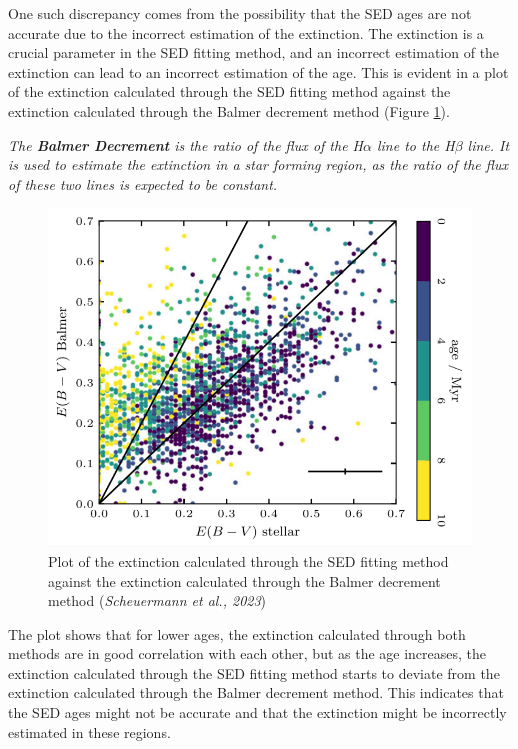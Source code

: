 \documentclass[12pt]{report}
\begin{document}
One such discrepancy comes from the possibility that the SED ages are not accurate due to the incorrect estimation of the extinction. The extinction is a crucial parameter in the SED fitting method, and an incorrect estimation of the extinction can lead to an incorrect estimation of the age. This is evident in a plot of the extinction calculated through the SED fitting method against the extinction calculated through the Balmer decrement method (Figure \ref{fig:image21}). 

\vspace*{0.6cm}
\textit{The \textbf{Balmer Decrement} is the ratio of the flux of the H$\alpha$ line to the H$\beta$ line. It is used to estimate the extinction in a star forming region, as the ratio of the flux of these two lines is expected to be constant.}\\

\begin{figure}[htbp]
    \centering
    \includegraphics[scale = 0.4]{image21.png}
    \caption{Plot of the extinction calculated through the SED fitting method against the extinction calculated through the Balmer decrement method (\textit{Scheuermann et al., 2023})}
    \label{fig:image21}
\end{figure}

The plot shows that for lower ages, the extinction calculated through both methods are in good correlation with each other, but as the age increases, the extinction calculated through the SED fitting method starts to deviate from the extinction calculated through the Balmer decrement method. This indicates that the SED ages might not be accurate and that the extinction might be incorrectly estimated in these regions.
\end{document}
